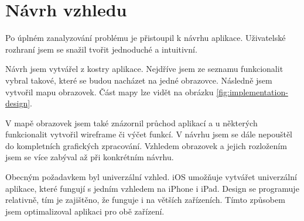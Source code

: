 \section{Návrh vzhledu}

Po úplném zanalyzování problému je přistoupil k návrhu aplikace.
Uživatelské rozhraní jsem se snažil tvořit jednoduché a intuitivní.

Návrh jsem vytvářel z kostry aplikace.
Nejdříve jsem ze seznamu funkcionalit vybral takové, které se budou nacházet na jedné obrazovce.
Následně jsem vytvořil mapu obrazovek.
Část mapy lze vidět na obrázku \ref{fig:implementation-design}.


V mapě obrazovek jsem také znázornil průchod aplikací a u některých funkcionalit vytvořil wireframe či výčet funkcí.
V návrhu jsem se dále nepouštěl do kompletních grafických zpracování.
Vzhledem obrazovek a jejich rozložením jsem se více zabýval až při konkrétním návrhu.

Obecným požadavkem byl univerzální vzhled.
iOS umožňuje vytvářet univerzální aplikace, které fungují s jedním vzhledem na iPhone i iPad.
Design se programuje relativně, tím je zajištěno, že funguje i na větších zařízeních. \cite{designcode-ios-guidelines}
Tímto způsobem jsem optimalizoval aplikaci pro obě zařízení.
